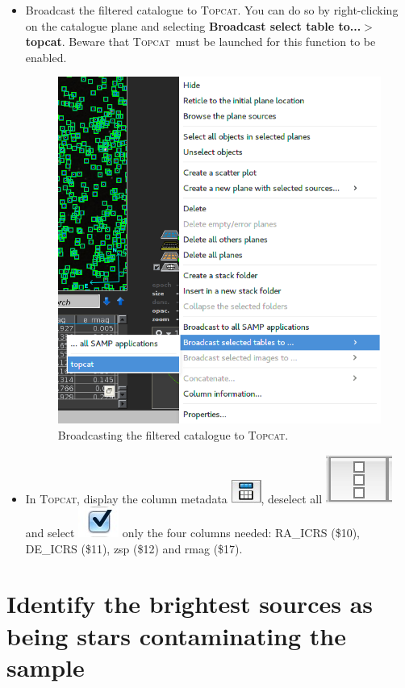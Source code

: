 \documentclass [a4paper, 12pt]{article}
\newcommand{\topcat}{{\textsc{Topcat}}}
\begin{document}
\begin{itemize}
\item Broadcast the filtered catalogue to \topcat. You can do so by 
right-clicking on the catalogue plane and selecting \textbf{Broadcast select 
table to...$>$ topcat}. Beware that \topcat\ must be launched for this function 
to be enabled.  

\begin{figure}[H]
\center
\includegraphics[width=0.4 \textwidth]{../images/aladin_send_table_topcat.png}
\caption{Broadcasting the filtered catalogue to \topcat.}
\label{fig:topcatbroadcast}
\end{figure}

\item In \topcat, display the column metadata  \includegraphics[width=0.04  
\textwidth]{../images/topcat_button_metadata.jpg}, deselect all   
\includegraphics[width=0.04  \textwidth]{../images/topcat_button_invisible.jpg} 
and 
select  \includegraphics[width=0.04  
\textwidth]{../images/topcat_button_select.jpg} 
only the four columns needed: RA\_ICRS (\$10), DE\_ICRS (\$11), zsp (\$12) and 
rmag (\$17).
\end{itemize}

\section{Identify the brightest sources as being stars contaminating the sample}
\end{document}
